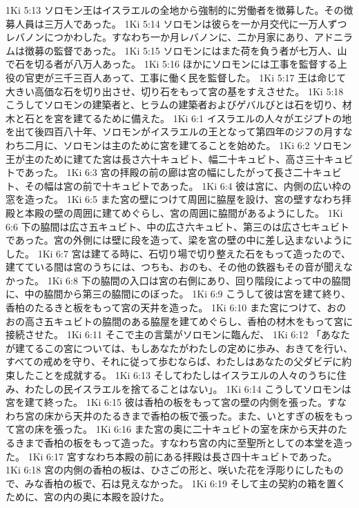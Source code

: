 1Ki 5:13  ソロモン王はイスラエルの全地から強制的に労働者を徴募した。その徴募人員は三万人であった。
1Ki 5:14  ソロモンは彼らを一か月交代に一万人ずつレバノンにつかわした。すなわち一か月レバノンに、二か月家にあり、アドニラムは徴募の監督であった。
1Ki 5:15  ソロモンにはまた荷を負う者が七万人、山で石を切る者が八万人あった。
1Ki 5:16  ほかにソロモンには工事を監督する上役の官吏が三千三百人あって、工事に働く民を監督した。
1Ki 5:17  王は命じて大きい高価な石を切り出させ、切り石をもって宮の基をすえさせた。
1Ki 5:18  こうしてソロモンの建築者と、ヒラムの建築者およびゲバルびとは石を切り、材木と石とを宮を建てるために備えた。
1Ki 6:1  イスラエルの人々がエジプトの地を出て後四百八十年、ソロモンがイスラエルの王となって第四年のジフの月すなわち二月に、ソロモンは主のために宮を建てることを始めた。
1Ki 6:2  ソロモン王が主のために建てた宮は長さ六十キュビト、幅二十キュビト、高さ三十キュビトであった。
1Ki 6:3  宮の拝殿の前の廊は宮の幅にしたがって長さ二十キュビト、その幅は宮の前で十キュビトであった。
1Ki 6:4  彼は宮に、内側の広い枠の窓を造った。
1Ki 6:5  また宮の壁につけて周囲に脇屋を設け、宮の壁すなわち拝殿と本殿の壁の周囲に建てめぐらし、宮の周囲に脇間があるようにした。
1Ki 6:6  下の脇間は広さ五キュビト、中の広さ六キュビト、第三のは広さ七キュビトであった。宮の外側には壁に段を造って、梁を宮の壁の中に差し込まないようにした。
1Ki 6:7  宮は建てる時に、石切り場で切り整えた石をもって造ったので、建てている間は宮のうちには、つちも、おのも、その他の鉄器もその音が聞えなかった。
1Ki 6:8  下の脇間の入口は宮の右側にあり、回り階段によって中の脇間に、中の脇間から第三の脇間にのぼった。
1Ki 6:9  こうして彼は宮を建て終り、香柏のたるきと板をもって宮の天井を造った。
1Ki 6:10  また宮につけて、おのおの高さ五キュビトの脇間のある脇屋を建てめぐらし、香柏の材木をもって宮に接続させた。
1Ki 6:11  そこで主の言葉がソロモンに臨んだ、
1Ki 6:12  「あなたが建てるこの宮については、もしあなたがわたしの定めに歩み、おきてを行い、すべての戒めを守り、それに従って歩むならば、わたしはあなたの父ダビデに約束したことを成就する。
1Ki 6:13  そしてわたしはイスラエルの人々のうちに住み、わたしの民イスラエルを捨てることはない」。
1Ki 6:14  こうしてソロモンは宮を建て終った。
1Ki 6:15  彼は香柏の板をもって宮の壁の内側を張った。すなわち宮の床から天井のたるきまで香柏の板で張った。また、いとすぎの板をもって宮の床を張った。
1Ki 6:16  また宮の奥に二十キュビトの室を床から天井のたるきまで香柏の板をもって造った。すなわち宮の内に至聖所としての本堂を造った。
1Ki 6:17  宮すなわち本殿の前にある拝殿は長さ四十キュビトであった。
1Ki 6:18  宮の内側の香柏の板は、ひさごの形と、咲いた花を浮彫りにしたもので、みな香柏の板で、石は見えなかった。
1Ki 6:19  そして主の契約の箱を置くために、宮の内の奥に本殿を設けた。
